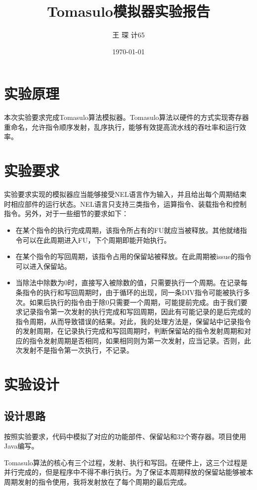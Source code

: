 \documentclass[paper=a4, fontsize=11pt, UTF8]{article} %
\title{\fontsize{18}\baselineskip Tomasulo模拟器实验报告}
\author{王 \; 琛 \quad 2016011360 \quad 计65}
\date{\normalsize\today} %
\begin{document}
\maketitle

\fontsize{11pt}{18pt}\selectfont

\section{实验原理}
本次实验要求完成Tomasulo算法模拟器。Tomasulo算法以硬件的方式实现寄存器重命名，允许指令顺序发射，乱序执行，能够有效提高流水线的吞吐率和运行效率。

\section{实验要求}
实验要求实现的模拟器应当能够接受NEL语言作为输入，并且给出每个周期结束时相应部件的运行状态。NEL语言只支持三类指令，运算指令、装载指令和控制指令。另外，对于一些细节的要求如下：
\begin{itemize}
    \item 在某个指令的执行完成周期，该指令所占有的FU就应当被释放。其他就绪指令可以在此周期进入FU，下个周期即能开始执行。
    \item 在某个指令的写回周期，该指令占用的保留站被释放。在此周期被issue的指令可以进入保留站。
    \item 当除法中除数为0时，直接写入被除数的值，只需要执行一个周期。在记录每条指令的执行和写回周期时，由于循环的出现，同一条DIV指令可能被执行多次。如果后执行的指令由于除0只需要一个周期，可能提前完成。由于我们要求记录指令第一次发射的执行完成和写回周期，因此有可能记录的是后完成的指令周期，从而导致错误的结果。对此，我的处理方法是，保留站中记录指令的发射周期，在记录执行完成和写回周期时，判断保留站的指令发射周期和对应的指令发射周期是否相同，如果相同则为第一次发射，应当记录。否则，此次发射不是指令第一次执行，不记录。
\end{itemize}



\section{实验设计}
\subsection{设计思路}
按照实验要求，代码中模拟了对应的功能部件、保留站和32个寄存器。项目使用Java编写。

Tomasulo算法的核心有三个过程，发射、执行和写回。在硬件上，这三个过程是并行完成的，但是程序中不得不串行执行。为了保证本周期释放的保留站能够被本周期发射的指令使用，我将发射放在了每个周期的最后完成。
\end{document}
